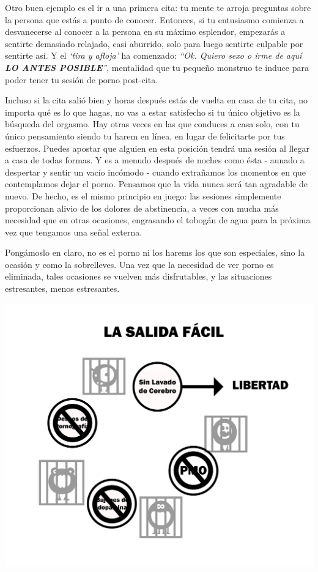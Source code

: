 \documentclass[
  spanish,
  openany]{book}
\begin{document}
Otro buen ejemplo es el ir a una primera cita: tu mente te arroja preguntas sobre la persona que estás a punto de conocer. Entonces, si tu entusiasmo comienza a desvanecerse al conocer a la persona en su máximo esplendor, empezarás a sentirte demasiado relajado, casi aburrido, solo para luego sentirte culpable por sentirte así. Y el \emph{`tira y afloja'} ha comenzado: \emph{``Ok. Quiero sexo o irme de aquí \textbf{LO ANTES POSIBLE}''}, mentalidad que tu pequeño monstruo te induce para poder tener tu sesión de porno post-cita.

Incluso si la cita salió bien y horas después estás de vuelta en casa de tu cita, no importa qué es lo que hagas, no vas a estar satisfecho si tu único objetivo es la búsqueda del orgasmo. Hay otras veces en las que conduces a casa solo, con tu único pensamiento siendo tu harem en línea, en lugar de felicitarte por tus esfuerzos. Puedes apostar que alguien en esta posición tendrá una sesión al llegar a casa de todas formas. Y es a menudo después de noches como ésta - aunado a despertar y sentir un vacío incómodo - cuando extrañamos los momentos en que contemplamos dejar el porno. Pensamos que la vida nunca será tan agradable de nuevo. De hecho, es el mismo principio en juego: las sesiones simplemente proporcionan alivio de los dolores de abstinencia, a veces con mucha más necesidad que en otras ocasiones, engrasando el tobogán de agua para la próxima vez que tengamos una señal externa.

Pongámoslo en claro, no es el porno ni los harems los que son especiales, sino la ocasión y como la sobrelleves. Una vez que la necesidad de ver porno es eliminada, tales ocasiones se vuelven más disfrutables, y las situaciones estresantes, menos estresantes.

\includegraphics{img-la-salida-facil.png}\\
\end{document}
